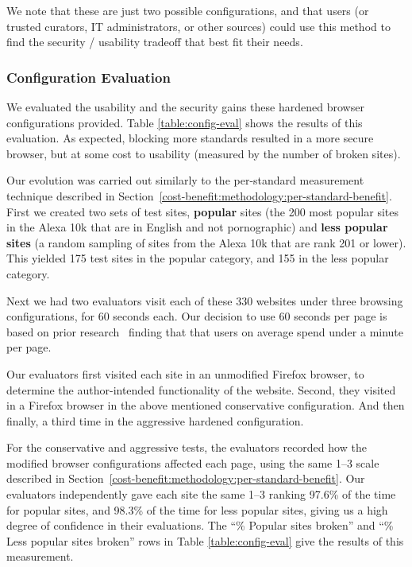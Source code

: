We note that these are just two possible configurations, and that users
(or trusted curators, IT administrators, or other sources) could
use this method to find the security / usability tradeoff that best fit their needs.


\subsubsection{Configuration Evaluation}
\label{subsubsec:eval-configs-evaluation}


We evaluated the usability and the security gains these hardened browser
configurations provided.  Table \ref{table:config-eval}
shows the results of this evaluation.  As expected, blocking more standards
resulted in a more secure browser, but at some cost to usability (measured
by the number of broken sites).

Our evolution was carried out similarly to the per-standard measurement
technique described in Section~\ref{cost-benefit:methodology:per-standard-benefit}.  First
we created two sets of test sites, \textbf{popular} sites (the 200 most popular
sites in the Alexa 10k that are in English and not pornographic) and
\textbf{less popular sites} (a random sampling of sites from the Alexa 10k that
are rank 201 or lower).  This yielded 175 test sites in the popular category,
and 155 in the less popular category.

Next we had two evaluators visit each of these 330 websites under three browsing
configurations, for 60 seconds each.  Our decision to use 60 seconds per page
is based on prior research~\cite{liu2010understanding} finding that
that users on average spend under a minute per page.

Our evaluators first visited each site in an unmodified
Firefox browser, to determine the author-intended functionality of the website.
Second, they visited in a Firefox browser in the above mentioned conservative
configuration.  And then finally, a third time in the aggressive hardened
configuration.

For the conservative and aggressive tests, the evaluators recorded how the
modified browser configurations affected each page, using the same 1--3 scale
described in Section~\ref{cost-benefit:methodology:per-standard-benefit}.  Our evaluators
independently gave each site the same 1--3 ranking 97.6\% of the time for
popular sites, and 98.3\% of the time for less popular sites, giving us
a high degree of confidence in their evaluations.  The ``\% Popular sites
broken'' and ``\% Less popular sites broken'' rows in Table
\ref{table:config-eval} give the results of this measurement.

